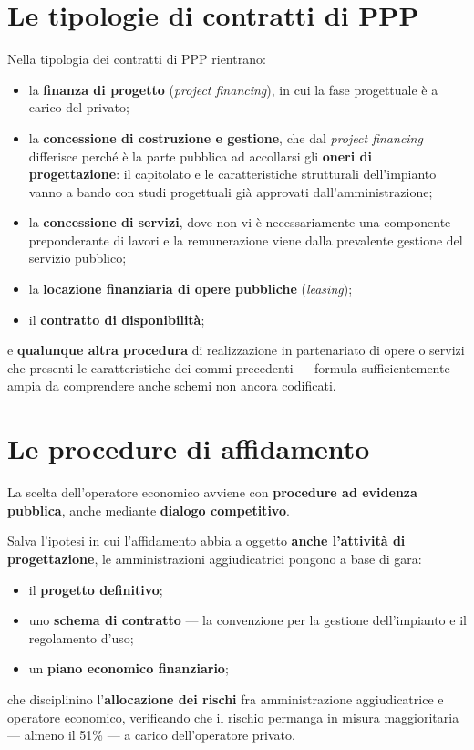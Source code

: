 
\section{Le tipologie di contratti di PPP}

Nella tipologia dei contratti di PPP rientrano:

\begin{itemize}
  \item la \textbf{finanza di progetto} (\textit{project financing}), in cui la fase progettuale è
    a carico del privato;
  \item la \textbf{concessione di costruzione e gestione}, che dal \textit{project financing}
    differisce perché è la parte pubblica ad accollarsi gli \textbf{oneri di progettazione}: il
    capitolato e le caratteristiche strutturali dell'impianto vanno a bando con studi progettuali
    già approvati dall'amministrazione;
  \item la \textbf{concessione di servizi}, dove non vi è necessariamente una componente
    preponderante di lavori e la remunerazione viene dalla prevalente gestione del servizio
    pubblico;
  \item la \textbf{locazione finanziaria di opere pubbliche} (\textit{leasing});
  \item il \textbf{contratto di disponibilità};
\end{itemize}

e \textbf{qualunque altra procedura} di realizzazione in partenariato di opere o servizi che
presenti le caratteristiche dei commi precedenti --- formula sufficientemente ampia da comprendere
anche schemi non ancora codificati.


\section{Le procedure di affidamento}

La scelta dell'operatore economico avviene con \textbf{procedure ad evidenza pubblica}, anche
mediante \textbf{dialogo competitivo}.

Salva l'ipotesi in cui l'affidamento abbia a oggetto \textbf{anche l'attività di progettazione}, le
amministrazioni aggiudicatrici pongono a base di gara:

\begin{itemize}
  \item il \textbf{progetto definitivo};
  \item uno \textbf{schema di contratto} --- la convenzione per la gestione dell'impianto e il
    regolamento d'uso;
  \item un \textbf{piano economico finanziario};
\end{itemize}

che disciplinino l'\textbf{allocazione dei rischi} fra amministrazione aggiudicatrice e operatore
economico, verificando che il rischio permanga in misura maggioritaria --- almeno il 51\% --- a
carico dell'operatore privato.
